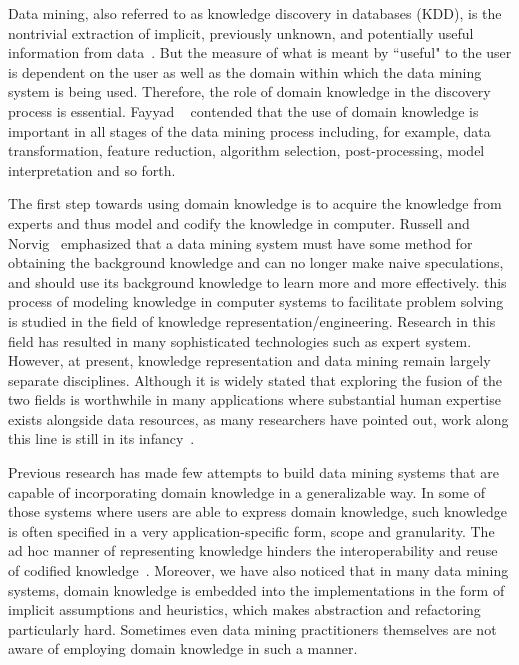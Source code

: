Data mining, also referred to as knowledge discovery in databases (KDD), is the nontrivial extraction of implicit, previously unknown, and potentially useful information from data~\cite{Frawley1992}. But the measure of what is meant by ``useful" to the user is dependent on the user as well as the domain within which the data mining system is being used. Therefore, the role of domain knowledge in the discovery process is essential. Fayyad \etal~\cite{Fayyad96} contended that the use of domain knowledge is important in all stages of the data mining process including, for example, data transformation, feature reduction, algorithm selection, post-processing, model interpretation and so forth.

The first step towards using domain knowledge is to acquire the knowledge from experts and thus model and codify the knowledge in computer. Russell and Norvig~\cite{Russell03} emphasized that a data mining system must have some method for obtaining the background knowledge and can no longer make naive speculations, and should use its background knowledge to learn more and more effectively. this process of modeling knowledge in computer systems to facilitate problem solving is studied in the field of knowledge representation/engineering. Research in this field has resulted in many sophisticated technologies such as expert system. However, at present, knowledge representation and data mining remain largely separate disciplines. Although it is widely stated that exploring the fusion of the two fields is worthwhile in many applications where substantial human expertise exists alongside data resources, as many researchers have pointed out, work along this line is still in its infancy~\cite{Hirsh94, Weiss01, Daniels01, Kopanas02, Langseth03}.

Previous research has made few attempts to build data mining systems that are capable of incorporating domain knowledge in a generalizable way. In some of those systems where users are able to express domain knowledge, such knowledge is often specified in a very application-specific form, scope and granularity. The ad hoc manner of representing knowledge hinders the interoperability and reuse of codified knowledge~\cite{Pohle03}. Moreover, we have also noticed that in many data mining systems, domain knowledge is embedded into the implementations in the form of implicit assumptions and heuristics, which makes abstraction and refactoring particularly hard. Sometimes even data mining practitioners themselves are not aware of employing domain knowledge in such a manner. 

